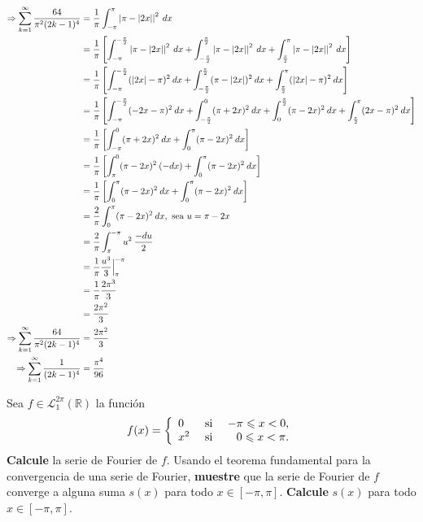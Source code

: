 \documentclass[12pt]{report}
\theoremstyle{largebreak}
\renewcommand{\leq}{\ensuremath{\leqslant}}
\newcommand\abs[1]{\ensuremath{\left|#1\right|}}
\begin{document}
\begin{sol}
\begin{equation*}
\begin{split}
                \Rightarrow \sum_{ k=1}^\infty\frac{64}{\pi^2(2k-1)^4}&=\frac{1}{\pi}\int_{-\pi}^\pi\abs{\pi-\abs{2x}}^2\:dx\\
                &=\frac{1}{\pi}\left[\int_{-\pi}^{-\frac{\pi}{2}}\abs{\pi-\abs{2x}}^2\:dx +\int_{-\frac{\pi}{2}}^{\frac{\pi}{2}}\abs{\pi-\abs{2x}}^2\:dx+\int_{\frac{\pi}{2}}^{\pi}\abs{\pi-\abs{2x}}^2\:dx \right]\\
                &=\frac{1}{\pi}\left[\int_{-\pi}^{-\frac{\pi}{2}}(\abs{2x}-\pi)^2\:dx +\int_{-\frac{\pi}{2}}^{\frac{\pi}{2}}(\pi-\abs{2x})^2\:dx+\int_{\frac{\pi}{2}}^{\pi}(\abs{2x}-\pi)^2\:dx \right]\\
                &=\frac{1}{\pi}\left[\int_{-\pi}^{-\frac{\pi}{2}}(-2x-\pi)^2\:dx+\int_{-\frac{\pi}{2}}^{0}(\pi+2x)^2\:dx+\int_{0}^{\frac{\pi}{2}}(\pi-2x)^2\:dx+\int_{\frac{\pi}{2}}^{\pi}(2x-\pi)^2\:dx \right]\\
                &=\frac{1}{\pi}\left[\int_{-\pi}^{0}(\pi+2x)^2\:dx+\int_{0}^{\pi}(\pi-2x)^2\:dx \right]\\
                &=\frac{1}{\pi}\left[\int_{\pi}^{0}(\pi-2x)^2\:(-dx)+\int_{0}^{\pi}(\pi-2x)^2\:dx \right]\\
                &=\frac{1}{\pi}\left[\int_{0}^{\pi}(\pi-2x)^2\:dx+\int_{0}^{\pi}(\pi-2x)^2\:dx \right]\\
                &=\frac{2}{\pi}\int_{0}^{\pi}(\pi-2x)^2\:dx,\textup{ sea }u=\pi-2x \\
                &=\frac{2}{\pi}\int_{\pi}^{-\pi}u^2\:\frac{-du}{2}\\
                &=\frac{1}{\pi}\frac{u^3}{3}\Big|_{\pi}^{-\pi}\\
                &=\frac{1}{\pi}\frac{2\pi^3}{3}\\
                &=\frac{2\pi^2}{3}\\
                \Rightarrow \sum_{ k=1}^\infty\frac{64}{\pi^2(2k-1)^4}&=\frac{2\pi^2}{3}\\
                \Rightarrow \sum_{ k=1}^\infty\frac{1}{(2k-1)^4}&=\frac{\pi^4}{96}\\
            \end{split}
        \end{equation*}
    \end{sol}

    \begin{excer}
        Sea $f\in\mathcal{L}_1^{2\pi}(\mathbb{R})$ la función
        \begin{equation*}
            f(x)=\left\{ 
                \begin{array}{lcr}
                    0 & \textup{ si } & -\pi\leq x<0,\\
                    x^2 & \textup{ si } & 0\leq x<\pi.\\
                \end{array}
            \right.
        \end{equation*}
        \textbf{Calcule} la serie de Fourier de $f$. Usando el teorema fundamental para la convergencia de una serie de Fourier, \textbf{muestre} que la serie de Fourier de $f$ converge a alguna suma $s(x)$ para todo $x\in[-\pi,\pi]$. \textbf{Calcule} $s(x)$ para todo $x\in[-\pi,\pi]$.
    \end{excer}
\end{document}

